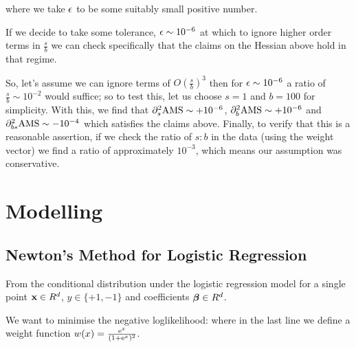 \begin{appendices}


where we take $\epsilon$ to be some suitably small positive number.

If we decide to take some tolerance, $\epsilon \sim 10^{-6}$ at which to ignore higher order terms in $\frac{s}{b}$ we can check specifically that the claims on the Hessian above hold in that regime.

So, let's assume we can ignore terms of $O(\frac{s}{b})^3$ then for $\epsilon\sim 10^{-6}$ a ratio of $\frac{s}{b}\sim 10^{-2}$ would suffice; so to test this, let us choose $s=1$ and $b=100$ for simplicity.
With this, we find that $\partial_s^2\rm{AMS} \sim +10^{-6}$, $\partial_b^2\rm{AMS} \sim +10^{-6}$ and $\partial_{bs}^2\rm{AMS} \sim -10^{-4}$ which satisfies the claims above.
Finally, to verify that this is a reasonable assertion, if we check the ratio of $s:b$ in the data (using the weight vector) we find a ratio of approximately $10^{-3}$, which means our assumption was conservative. 


\section{Modelling}

\subsection{Newton's Method for Logistic Regression}
\label{appendix:newton_lr}
From the conditional distribution under the logistic regression model for a single point $\mathbf{x} \in R^d$, $y \in \{+1,-1\}$ and coefficients $\bm{\beta} \in R^d$.

We want to minimise the negative loglikelihood:
where in the last line we define a weight function $w(x) = \frac{\mathrm{e}^x}{(1+\mathrm{e}^x)^2}$.


\end{appendices}
